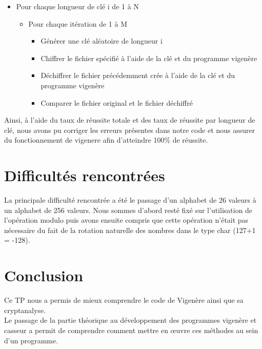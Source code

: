 \documentclass[a4paper, 11pt, oneside]{article}
\begin{document}
\begin{itemize}
 \item Pour chaque longueur de clé i de 1 à N
 \begin{itemize}
  \item Pour chaque itération de 1 à M
  \begin{itemize}
   \item Générer une clé aléatoire de longueur i
   \item Chiffrer le fichier spécifié à l'aide de la clé et du programme vigenère
   \item Déchiffrer le fichier précédemment crée à l'aide de la clé et du programme vigenère
   \item Comparer le fichier original et le fichier déchiffré
  \end{itemize}

 \end{itemize}

\end{itemize}
\vspace{0.5em}

Ainsi, à l'aide du taux de réussite totale et des taux de réussite par longueur de clé, nous avons pu corriger les erreurs présentes dans notre code et nous assurer du fonctionnement de vigenere afin d'atteindre 100\% de réussite.

\section{Difficultés rencontrées}

La principale difficulté rencontrée a été le passage d'un alphabet de 26 valeurs à un alphabet de 256 valeurs. Nous sommes d'abord resté fixé sur l'utilisation de l'opération modulo puis avons ensuite compris que cette opération n'était pas nécessaire du fait de la rotation naturelle des  nombres dans le type char (127+1 = -128).

\section*{Conclusion}

Ce TP nous a permis de mieux comprendre le code de Vigenère ainsi que sa cryptanalyse.\\
Le passage de la partie théorique au développement des programmes vigenère et casseur a permit de comprendre comment mettre en œuvre ces méthodes au sein d'un programme.
\end{document}
